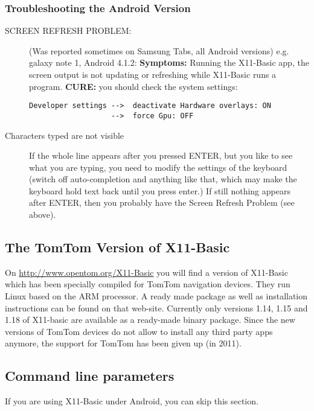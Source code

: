 \subsubsection*{Troubleshooting the Android Version}
\begin{description}

\item[SCREEN REFRESH PROBLEM:] (Was reported sometimes on Samsung Tabs, 
all Android versions) e.g. galaxy note 1, Android 4.1.2:
{\bf Symptoms:} Running the X11-Basic app, the screen output is not updating or 
refreshing while X11-Basic runs a program. 
{\bf CURE:} you should check the system settings:
\begin{verbatim}
Developer settings -->  deactivate Hardware overlays: ON 
                   -->  force Gpu: OFF 
\end{verbatim}

\item[Characters typed are not visible] If the whole line appears  after you
pressed ENTER, but you like to see what you are typing, you  need to modify the
settings of the keyboard (switch off auto-completion  and anything like that,
which may make the keyboard hold text back until you press enter.) If still 
nothing appears after ENTER, then you probably have the Screen Refresh Problem 
(see above).

\end{description}

\subsection{The TomTom Version of X11-Basic}

On \url{http://www.opentom.org/X11-Basic} you will find a version of X11-Basic
which has been specially compiled for TomTom navigation devices. They run Linux
based on the ARM processor. A ready made package as well as installation
instructions can be found on that web-site. Currently only versions  1.14, 1.15
and 1.18 of X11-basic are available as a ready-made binary package. Since the
new versions of TomTom devices do not allow to install any third party apps
anymore, the support for TomTom has been given up (in 2011).

\subsection{Command line parameters}

If you are using X11-Basic under Android, you can skip this section.

